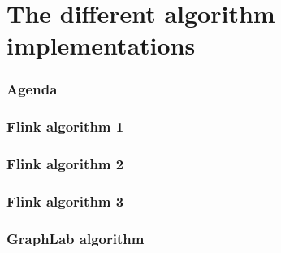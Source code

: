 \section{The different algorithm implementations}

\begin{frame}
\frametitle{Agenda}
\tableofcontents[currentsection]
\end{frame}


\begin{frame}
\frametitle{Flink algorithm 1}
\end{frame}

\begin{frame}
\frametitle{Flink algorithm 2}
\end{frame}

\begin{frame}
\frametitle{Flink algorithm 3}
\end{frame}

\begin{frame}
\frametitle{GraphLab algorithm}
\end{frame}
